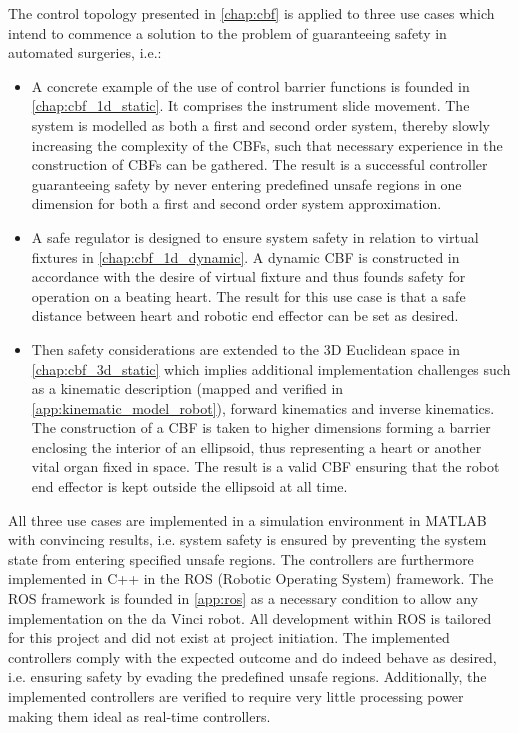The control topology presented in \autoref{chap:cbf} is applied to three use cases which intend to commence a solution to the problem of guaranteeing safety in automated surgeries, i.e.:
\begin{itemize}
\item A concrete example of the use of control barrier functions is founded in \autoref{chap:cbf_1d_static}. It comprises the instrument slide movement. The system is modelled as both a first and second order system, thereby slowly increasing the complexity of the CBFs, such that necessary experience in the construction of CBFs can be gathered. The result is a successful controller guaranteeing safety by never entering predefined unsafe regions in one dimension for both a first and second order system approximation.
\item A safe regulator is designed to ensure system safety in relation to virtual fixtures in \autoref{chap:cbf_1d_dynamic}. A dynamic CBF is  constructed in accordance with the desire of virtual fixture and thus founds safety for operation on a beating heart. The result for this use case is that a safe distance between heart and robotic end effector can be set as desired.
\item Then safety considerations are extended to the 3D Euclidean space in \autoref{chap:cbf_3d_static} which implies additional implementation challenges such as a kinematic description (mapped and verified in \autoref{app:kinematic_model_robot}), forward kinematics and inverse kinematics. The construction of a CBF is taken to higher dimensions forming a barrier enclosing the interior of an ellipsoid, thus representing a heart or another vital organ fixed in space. The result is a valid CBF ensuring that the robot end effector is kept outside the ellipsoid at all time.
\end{itemize}
All three use cases are implemented in a simulation environment in MATLAB with convincing results, i.e. system safety is ensured by preventing the system state from entering specified unsafe regions. The controllers are furthermore implemented in C++ in the ROS (Robotic Operating System) framework. The ROS framework is founded in \autoref{app:ros} as a necessary condition to allow any implementation on the da Vinci robot. All development within ROS is tailored for this project and did not exist at project initiation. The implemented controllers comply with the expected outcome and do indeed behave as desired, i.e. ensuring safety by evading the predefined unsafe regions. Additionally, the implemented controllers are verified to require very little processing power making them ideal as real-time controllers.


